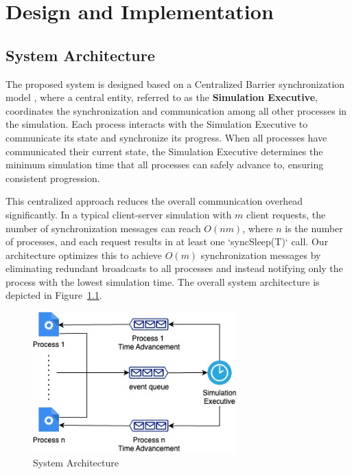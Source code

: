 \chapter{Design and Implementation}

\section{System Architecture}

The proposed system is designed based on a Centralized Barrier synchronization model \cite{PaDSS}, where a central entity, referred to as the \textbf{Simulation Executive}, coordinates the synchronization and communication among all other processes in the simulation. Each process interacts with the Simulation Executive to communicate its state and synchronize its progress. When all processes have communicated their current state, the Simulation Executive determines the minimum simulation time that all processes can safely advance to, ensuring consistent progression.

This centralized approach reduces the overall communication overhead significantly. In a typical client-server simulation with $m$ client requests, the number of synchronization messages can reach $O(nm)$, where $n$ is the number of processes, and each request results in at least one `syncSleep(T)` call. Our architecture optimizes this to achieve $O(m)$ synchronization messages by eliminating redundant broadcasts to all processes and instead notifying only the process with the lowest simulation time. The overall system architecture is depicted in Figure~\ref{fig:arch}.

\begin{figure}[H]
    \centering
    \includegraphics[width=0.7\textwidth]{images/architecture_program.jpg}
    \caption{System Architecture}
    \label{fig:arch}
\end{figure}

